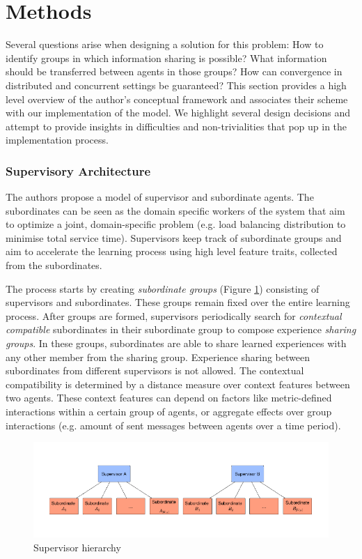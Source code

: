 \documentclass[letterpaper]{article}
\begin{document}
\section{Methods} \label{sec:methods}
Several questions arise when designing a solution for this problem: How to identify groups in which information sharing is possible? What information should be transferred between agents in those groups? How can convergence in distributed and concurrent settings be guaranteed? This section provides a high level overview of the author’s conceptual framework and associates their scheme with our implementation of the model.  We highlight several design decisions and attempt to provide insights in difficulties and non-trivialities that pop up in the implementation process.

\subsubsection{Supervisory Architecture}
The authors propose a model of supervisor and subordinate agents. The subordinates can be seen as the domain specific workers of the system that aim to optimize a joint, domain-specific problem (e.g. load balancing distribution to minimise total service time). Supervisors keep track of subordinate groups and aim to accelerate the learning process using high level feature traits, collected from the subordinates.

The process starts by creating \textit{subordinate groups} (Figure \ref{fig:subordinate}) consisting of supervisors and subordinates. These groups remain fixed over the entire learning process. After groups are formed, supervisors periodically search for \textit{contextual compatible} subordinates in their subordinate group to compose experience \textit{sharing groups}. In these groups, subordinates are able to share learned experiences with any other member from the sharing group. Experience sharing between subordinates from different supervisors is not allowed. The contextual compatibility is determined by a distance measure over context features between two agents. These context features can depend on factors like metric-defined interactions within a certain group of agents, or aggregate effects over group interactions (e.g. amount of sent messages between agents over a time period).
\begin{figure}[H]
 \begin{center}
  \includegraphics[width=\linewidth]{figures/subordinates}
  \caption{Supervisor hierarchy \citep{garant2015accelerating}}
  \label{fig:subordinate}
 \end{center}
\end{figure}
\end{document}
